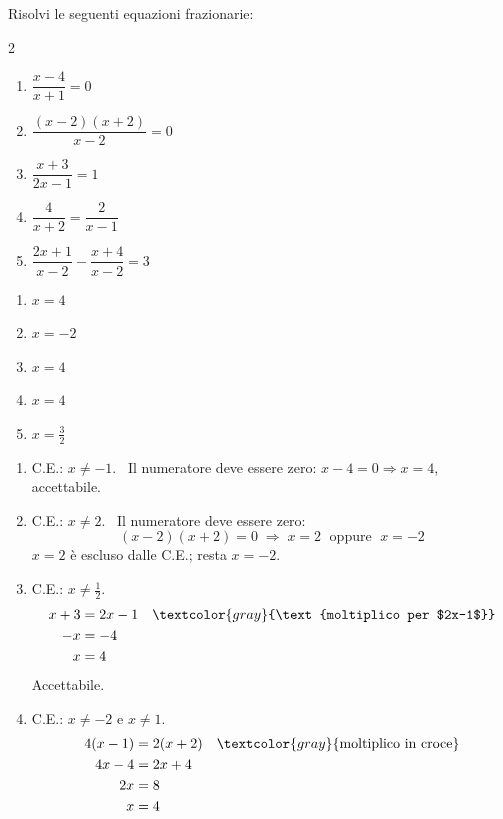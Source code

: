 \begin{question}[ID=3.2, subtitle={Equazioni frazionarie}, difficulty=facile, tags={equazioni frazionarie}]
Risolvi le seguenti equazioni frazionarie:
\begin{multicols}{2}
\begin{enumerate}[leftmargin=3cm]
    \item $\dfrac{x-4}{x+1} = 0$
    \item $\dfrac{(x-2)(x+2)}{x-2} = 0$
    \item $\dfrac{x+3}{2x-1} = 1$
    \item $\dfrac{4}{x+2} = \dfrac{2}{x-1}$
    \item $\dfrac{2x+1}{x-2} - \dfrac{x+4}{x-2} = 3$
\end{enumerate}
\end{multicols}
\begin{solution}
\begin{enumerate}
    \item $x=4$
    \item $x=-2$
    \item $x=4$
    \item $x=4$
    \item $x=\tfrac32$
\end{enumerate}
\end{solution}
\begin{explanation}
\begin{enumerate}
    \item C.E.: $x\neq-1$. \ Il numeratore deve essere zero: $x-4=0 \Rightarrow x=4$, accettabile.
    \item C.E.: $x\neq2$. \ Il numeratore deve essere zero:
    \[ (x-2)(x+2)=0 \;\Rightarrow\; x=2 \;\text{ oppure }\; x=-2 \]
    $x=2$ è escluso dalle C.E.; resta $x=-2$.
    \item C.E.: $x\neq\tfrac12$.
    \[\begin{aligned}
    x+3 &= 2x-1 && \textcolor{gray}{\text{moltiplico per $2x-1$}}\\
    -x &= -4\\
    x &= 4
    \end{aligned}\]
    Accettabile.
    \item C.E.: $x\neq-2$ e $x\neq1$.
    \[\begin{aligned}
    4(x-1) &= 2(x+2) && \textcolor{gray}{\text{moltiplico in croce}}\\
    4x-4 &= 2x+4\\
    2x &= 8\\
    x &= 4
    \end{aligned}\]

\end{enumerate}
\end{explanation}
\end{question}
